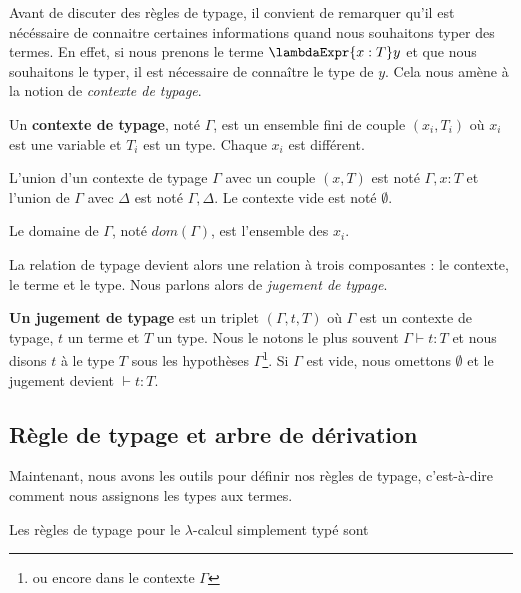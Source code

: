 Avant de discuter des règles de typage, il convient de remarquer qu'il est
nécéssaire de connaitre certaines informations quand nous souhaitons typer des
termes. En effet, si nous prenons le terme $\lambdaExpr{x : T} y$ et que nous
souhaitons le typer, il est nécessaire de connaître le type de $y$. Cela nous
amène à la notion de \textit{contexte de typage}.

\begin{definition} 
  \label{def:simply-typed-lambda-calculus-context}
  Un \textbf{contexte de typage}, noté $\Gamma$, est un ensemble fini de couple $(x_{i},
  T_{i})$ où $x_{i}$ est une variable et $T_{i}$ est un type. Chaque $x_{i}$ est différent.
  
  L'union d'un contexte de typage $\Gamma$ avec un couple $(x, T)$ est noté
  $\Gamma, x : T$ et l'union de $\Gamma$ avec $\Delta$ est noté $\Gamma, \Delta$.
  Le contexte vide est noté $\emptyset$.

  Le domaine de $\Gamma$, noté $dom(\Gamma)$, est l'ensemble des $x_{i}$.
\end{definition}

La relation de typage devient alors une relation à trois composantes : le
contexte, le terme et le type. Nous parlons alors de \textit{jugement de typage}.

\begin{definition} 
  \label{def:simply-typed-lambda-calculus-judgement}
  \textbf{Un jugement de typage} est un triplet $(\Gamma, t, T)$ où $\Gamma$ est un
  contexte de typage, $t$ un terme et $T$ un type. Nous le notons le plus
  souvent $\Gamma \vdash t : T$ et nous disons \og $t$ à le type $T$ sous les
  hypothèses $\Gamma$\footnote{ou encore dans le contexte $\Gamma$}. Si $\Gamma$
  est vide, nous omettons $\emptyset$ et le jugement devient $\vdash t : T$.
\end{definition}

\subsection*{Règle de typage et arbre de dérivation}

Maintenant, nous avons les outils pour définir nos règles de typage,
c'est-à-dire comment nous assignons les types aux termes.

\begin{definition} 
  \label{def:simply-typed-lambda-calculus-typing-rules}
  Les règles de typage pour le $\lambda$-calcul simplement typé sont
\end{definition}

